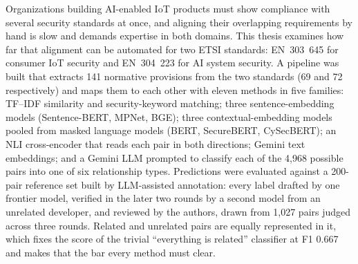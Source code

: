 Organizations building AI-enabled IoT products must show compliance with several
security standards at once, and aligning their overlapping requirements by hand is
slow and demands expertise in both domains. This thesis examines how far that
alignment can be automated for two ETSI standards: EN~303~645 for consumer IoT
security and EN~304~223 for AI system security. A pipeline was built that extracts
141 normative provisions from the two standards (69 and 72 respectively) and maps
them to each other with eleven methods in five families: TF--IDF similarity and
security-keyword matching; three sentence-embedding models (Sentence-BERT, MPNet,
BGE); three contextual-embedding models pooled from masked language models (BERT,
SecureBERT, CySecBERT); an NLI cross-encoder that reads each pair in both
directions; Gemini text embeddings; and a Gemini LLM prompted to classify each of
the 4{,}968 possible pairs into one of six relationship types. Predictions were
evaluated against a 200-pair reference set built by LLM-assisted annotation:
every label drafted by one frontier model, verified in the later two rounds by a
second model from an unrelated developer, and reviewed by the authors, drawn from
1{,}027 pairs judged across three rounds. Related and unrelated pairs are
equally represented in it, which fixes the score of the trivial ``everything is
related'' classifier at F1 0.667 and makes that the bar every method must clear.

